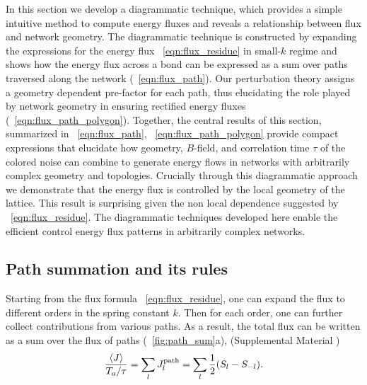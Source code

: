 \documentclass[
 preprint,
 preprintnumbers,
 amsmath,amssymb,
 aps,
 pre,
 longbibliography,
 superscriptaddress,
 10pt, twocolumn
]{revtex4-1}
\begin{document}
In this section we develop a diagrammatic technique, which provides a simple intuitive method to compute energy fluxes and reveals a relationship between flux and network geometry.
The diagrammatic technique is constructed by expanding the expressions for the energy flux \eqnname~\eqref{eqn:flux_residue} in small-$k$ regime and shows how the energy flux across a bond can be expressed as a sum over paths traversed along the network (\eqnname~\eqref{eqn:flux_path}). Our perturbation theory assigns a geometry dependent pre-factor for each path, thus elucidating the role played by network geometry in ensuring rectified energy fluxes (\eqnname~\eqref{eqn:flux_path_polygon}). Together, the central results of this section, summarized in  \eqnname~\ref{eqn:flux_path}, \eqnname~\ref{eqn:flux_path_polygon} provide compact expressions that elucidate how geometry, $B$-field, and correlation time $\tau$ of the colored noise can combine to generate energy flows in networks with arbitrarily complex geometry and topologies. Crucially through this diagrammatic approach we demonstrate that the energy flux is controlled by the local geometry of the lattice. This result is surprising given the non local dependence suggested by \eqnname~\ref{eqn:flux_residue}. The diagrammatic techniques developed here enable the efficient control energy flux patterns in arbitrarily complex networks. 


\subsection{Path summation and its rules}
Starting from the flux formula \eqnname~\eqref{eqn:flux_residue}, one can expand the flux to different orders in the spring constant $k$. Then for each order, one can further collect contributions from various paths.
As a result, the total flux can be written as a sum over the flux of paths (\figurename~\ref{fig:path_sum}a), (Supplemental Material \cite{SupplementalMaterial})
\begin{equation} \label{eqn:flux_path}
    \frac{\expval{J}}{T_a/\tau} = \sum_l J^\text{path}_l = \sum_l \frac{1}{2}(S_l - S_{-l}).
\end{equation}
\end{document}
